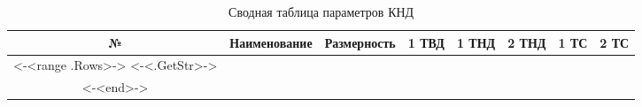 \begin{landscape}
    \begin{center}
        \begin{longtable}{|c|c|c|c|c|c|c|c|}
            \hline
            \textbf{№} &
            \textbf{Наименование} &
            \textbf{Размерность} &
            \textbf{1 ТВД} &
            \textbf{1 ТНД} &
            \textbf{2 ТНД} &
            \textbf{1 ТС} &
            \textbf{2 ТС} \\\hline
            \endhead
            <-<range .Rows>->
            <-<.GetStr>-> \\\hline
            <-<end>->
            \caption{Сводная таблица параметров КНД} \label{tab:turbine-stage-total}
        \end{longtable}
    \end{center}
\end{landscape}